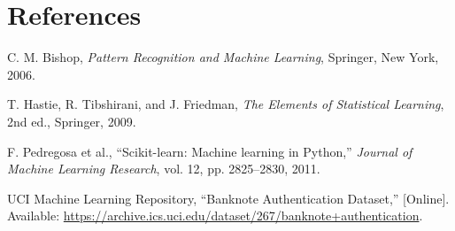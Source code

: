 \documentclass[12pt,a4paper]{article}
\begin{document}
\section{References}
\begin{enumerate}[label={[\arabic*]}]
    \item C. M. Bishop, \textit{Pattern Recognition and Machine Learning}, Springer, New York, 2006.
    \item T. Hastie, R. Tibshirani, and J. Friedman, \textit{The Elements of Statistical Learning}, 2nd ed., Springer, 2009.
    \item F. Pedregosa et al., ``Scikit-learn: Machine learning in Python,'' \textit{Journal of Machine Learning Research}, vol. 12, pp. 2825--2830, 2011.
    \item UCI Machine Learning Repository, ``Banknote Authentication Dataset,'' [Online]. Available: \url{https://archive.ics.uci.edu/dataset/267/banknote+authentication}.
\end{enumerate}
\end{document}
